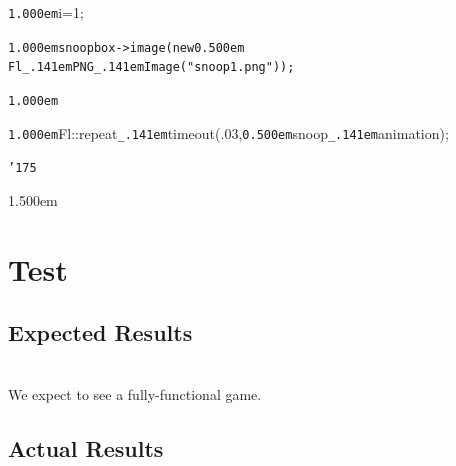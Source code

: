 \documentclass[12pt]{article}
\begin{document}
\noindent
{}{\tt\mc \kern1.000em}i=1;

\noindent
{}{\tt\mc \kern1.000em}\tt\mc {\tt /}{\tt /}snoopbox{\tt -}{\tt >}image(new\kern0.500em Fl{\tt\_\kern.141em}PNG{\tt\_\kern.141em}Image({\tt "}snoop1.png{\tt "}));

\noindent
\tt{}

\noindent
{}{\tt\mc \kern1.000em}

\noindent
{}{\tt\mc \kern1.000em}Fl::repeat{\tt\_\kern.141em}timeout(.03,{\tt\mc \kern0.500em}snoop{\tt\_\kern.141em}animation);

\noindent
{}{\tt\char'175}

\noindent
{}\rm\mc {\tt /}{\tt *}{\tt *}

\noindent
\kern1.500em  \section{Test}
   
   \subsection{Expected Results}\\
   
   We expect to see a fully-functional game.
   
   \subsection{Actual Results}\\
   
   
\end{document}

